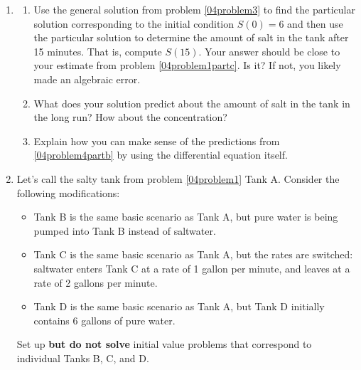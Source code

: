 \begin{enumerate}[resume]
\item \label{04problem4}
\begin{enumerate}
\item Use the general solution from problem \ref{04problem3} to find the particular solution corresponding to the initial condition $S(0) = 6$ and then use the particular solution to determine the amount of salt in the tank after 15 minutes. That is, compute $S(15)$. Your answer should be close to your estimate from problem \ref{04problem1partc}. Is it? If not, you likely made an algebraic error. \label{04problem4parta}
\vfill
\item What does your solution predict about the amount of salt in the tank in the long run?  How about the concentration? \label{04problem4partb}
\vfill
\item Explain how you can make sense of the predictions from \ref{04problem4partb} by using the differential equation itself. \label{04problem4partc}
\vfill
\end{enumerate}
\newpage

\item Let's call the salty tank from problem \ref{04problem1} Tank A. Consider the following modifications: \label{04problem5}
\begin{itemize}
\item Tank B is the same basic scenario as Tank A, but pure water is being pumped into Tank B instead of saltwater.
\item Tank C is the same  basic scenario as Tank A, but the rates are switched: saltwater enters Tank C at a rate of 1 gallon per minute, and leaves at a rate of 2 gallons per minute.
\item Tank D is the same  basic scenario as Tank A, but Tank D initially contains 6 gallons of pure water.
\end{itemize}
Set up \textbf{but do not solve} initial value problems that correspond to individual Tanks B, C, and D.

\end{enumerate}

\clearpage


